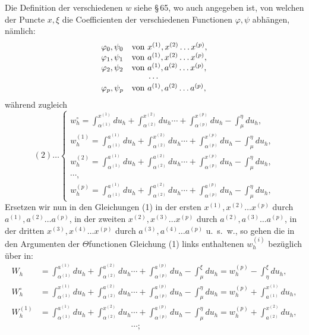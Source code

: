 \documentclass[10pt]{article}
\begin{document}
Die Definition der verschiedenen \(w\) siehe \S\,65, wo auch angegeben ist, von welchen der Puncte \(x,\xi\) die Coefficienten der verschiedenen Functionen \(\varphi,\psi\) abhängen, nämlich:
\[
\begin{array}{ll}
\varphi_0,\psi_0 & \text{von }x^{(1)},x^{(2)}\ldots x^{(p)},\\
\varphi_1,\psi_1 & \text{von }a^{(1)},x^{(2)}\ldots x^{(p)},\\
\varphi_2,\psi_2 & \text{von }a^{(1)},a^{(2)}\ldots x^{(p)},\\
\multicolumn{2}{c}{\cdots}\\
\varphi_p,\psi_p & \text{von }a^{(1)},a^{(2)}\ldots a^{(p)},
\end{array}
\]
während zugleich
\[
(2)\ldots
\begin{cases}
w_h^\circ=\displaystyle\int_{\alpha^{(1)}}^{x^{(1)}}du_h+\int_{\alpha^{(2)}}^{x^{(2)}}du_h\cdots+\int_{\alpha^{(p)}}^{x^{(p)}}du_h-\int_{\mu}^{\eta}du_h,\\[0.55em]
w_h^{(1)}=\displaystyle\int_{\alpha^{(1)}}^{a^{(1)}}du_h+\int_{\alpha^{(2)}}^{x^{(2)}}du_h\cdots+\int_{\alpha^{(p)}}^{x^{(p)}}du_h-\int_{\mu}^{\eta}du_h,\\[0.55em]
w_h^{(2)}=\displaystyle\int_{\alpha^{(1)}}^{a^{(1)}}du_h+\int_{\alpha^{(2)}}^{a^{(2)}}du_h\cdots+\int_{\alpha^{(p)}}^{x^{(p)}}du_h-\int_{\mu}^{\eta}du_h,\\
\cdots,\\
w_h^{(p)}=\displaystyle\int_{\alpha^{(1)}}^{a^{(1)}}du_h+\int_{\alpha^{(2)}}^{a^{(2)}}du_h\cdots+\int_{\alpha^{(p)}}^{a^{(p)}}du_h-\int_{\mu}^{\eta}du_h,
\end{cases}
\]
Ersetzen wir nun in den Gleichungen (1) in der ersten \(x^{(1)},x^{(2)}\ldots x^{(p)}\) durch \(a^{(1)},a^{(2)}\ldots a^{(p)}\), in der zweiten \(x^{(2)},x^{(3)}\ldots x^{(p)}\) durch \(a^{(2)},a^{(3)}\ldots a^{(p)}\), in der dritten \(x^{(3)},x^{(4)}\ldots x^{(p)}\) durch \(a^{(3)},a^{(4)}\ldots a^{(p)}\) u.~s.~w., so gehen die in den Argumenten der \(\Theta\)functionen Gleichung (1) links enthaltenen \(w_h^{(i)}\) bezüglich über in:
\[
\begin{aligned}
W_h&=\int_{\alpha^{(1)}}^{a^{(1)}}du_h+\int_{\alpha^{(2)}}^{a^{(2)}}du_h\cdots+\int_{\alpha^{(p)}}^{a^{(p)}}du_h-\int_{\mu}^{\xi}du_h
=w_h^{(p)}-\int_{\eta}^{\xi}du_h,\\
W_h^\circ&=\int_{\alpha^{(1)}}^{x^{(1)}}du_h+\int_{\alpha^{(2)}}^{a^{(2)}}du_h\cdots+\int_{\alpha^{(p)}}^{a^{(p)}}du_h-\int_{\mu}^{\eta}du_h
=w_h^{(p)}+\int_{a^{(1)}}^{x^{(1)}}du_h,\\
W_h^{(1)}&=\int_{\alpha^{(1)}}^{a^{(1)}}du_h+\int_{\alpha^{(2)}}^{x^{(2)}}du_h\cdots+\int_{\alpha^{(p)}}^{a^{(p)}}du_h-\int_{\mu}^{\eta}du_h
=w_h^{(p)}+\int_{a^{(2)}}^{x^{(2)}}du_h,\\
&\hspace{11em}\cdots;
\end{aligned}
\]
\end{document}

